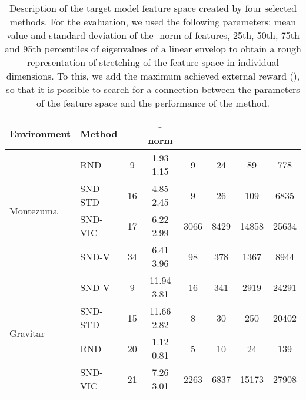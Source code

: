 \documentclass[a4paper,11pt]{elsarticle}
\begin{document}
\begin{table}[t!]
\scriptsize
\centering
\caption{Description of the target model feature space created by four selected methods. For the evaluation, we used the following parameters: mean value and standard deviation of the -norm of features, 25th, 50th, 75th and 95th percentiles of eigenvalues of a linear envelop to obtain a rough representation of stretching of the feature space in individual dimensions. To this, we add the maximum achieved external reward (), so that it is possible to search for a connection between the parameters of the feature space and the performance of the method.}
\begin{tabular}{l|l|cccccc}
\hline
 Environment & Method &  & -norm &  &  &  &  \\
\hline\hline
\multirow{4}{*}{Montezuma}
& \multicolumn{1}{l|}{RND} & \multicolumn{1}{c}{9} & \multicolumn{1}{c}{1.93  1.15} & \multicolumn{1}{c}{9} & \multicolumn{1}{c}{24} & \multicolumn{1}{c}{89} & \multicolumn{1}{c}{778} \\
& \multicolumn{1}{l|}{SND-STD} & \multicolumn{1}{c}{16} & \multicolumn{1}{c}{4.85  2.45} & \multicolumn{1}{c}{9} & \multicolumn{1}{c}{26} & \multicolumn{1}{c}{109} & \multicolumn{1}{c}{6835} \\
& \multicolumn{1}{l|}{SND-VIC} & \multicolumn{1}{c}{17} & \multicolumn{1}{c}{6.22  2.99} & \multicolumn{1}{c}{3066} & \multicolumn{1}{c}{8429} & \multicolumn{1}{c}{14858} & \multicolumn{1}{c}{25634} \\
& \multicolumn{1}{l|}{SND-V} & \multicolumn{1}{c}{34} & \multicolumn{1}{c}{6.41  3.96} & \multicolumn{1}{c}{98} & \multicolumn{1}{c}{378} & \multicolumn{1}{c}{1367} & \multicolumn{1}{c}{8944} \\
\hline \multirow{4}{*}{Gravitar}
& \multicolumn{1}{l|}{SND-V} & \multicolumn{1}{c}{9} & \multicolumn{1}{c}{11.94  3.81} & \multicolumn{1}{c}{16} & \multicolumn{1}{c}{341} & \multicolumn{1}{c}{2919} & \multicolumn{1}{c}{24291} \\
& \multicolumn{1}{l|}{SND-STD} & \multicolumn{1}{c}{15} & \multicolumn{1}{c}{11.66  2.82} & \multicolumn{1}{c}{8} & \multicolumn{1}{c}{30} & \multicolumn{1}{c}{250} & \multicolumn{1}{c}{20402} \\
& \multicolumn{1}{l|}{RND} & \multicolumn{1}{c}{20} & \multicolumn{1}{c}{1.12  0.81} & \multicolumn{1}{c}{5} & \multicolumn{1}{c}{10} & \multicolumn{1}{c}{24} & \multicolumn{1}{c}{139} \\
& \multicolumn{1}{l|}{SND-VIC} & \multicolumn{1}{c}{21} & \multicolumn{1}{c}{7.26  3.01} & \multicolumn{1}{c}{2263} & \multicolumn{1}{c}{6837} & \multicolumn{1}{c}{15173} & \multicolumn{1}{c}{27908} \\

\end{tabular}
\end{table}
\end{document}
